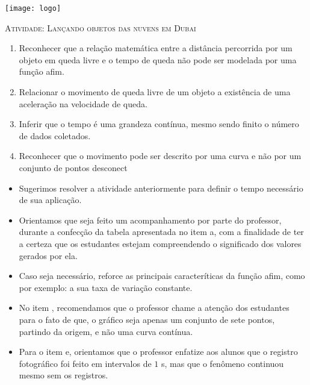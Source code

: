 \documentclass[10 pt,usenames,dvipsnames, oneside]{article}
\begin{document}
\begin{center}
  \begin{minipage}[l]{3cm}
\texttt{[image: logo]}    
\end{minipage}\hfill
\begin{minipage}[r]{.8\textwidth}
 {\Large \scshape Atividade: Lançando objetos das nuvens em Dubai}  
\end{minipage}
\end{center}
\vspace{.2cm}

\ifdefined\prof

\begin{goals}
\begin{enumerate}
\item Reconhecer que a relação matemática entre a distância percorrida por um objeto em queda livre e o tempo de queda não pode ser modelada por uma função afim.
\item Relacionar o movimento de queda livre de um objeto a existência de uma aceleração na velocidade de queda.
\item Inferir que o tempo é uma grandeza contínua, mesmo sendo finito o número de dados coletados.
\item Reconhecer que o movimento pode ser descrito por uma curva e não por um conjunto de pontos desconect
\end{enumerate}

\tcblower

\begin{itemize}
\item Sugerimos resolver a atividade anteriormente para definir o tempo necessário de sua aplicação.
\item Orientamos que seja feito um acompanhamento por parte do professor, durante a confecção da tabela apresentada no item a, com a finalidade de ter a certeza que os estudantes estejam compreendendo o significado dos valores gerados por ela.
\item Caso seja necessário, reforce as principais caracteríticas da função afim, como por exemplo: a sua taxa de variação constante.
\item No item , recomendamos que o professor chame a atenção dos estudantes para o fato de que, o gráfico seja apenas um conjunto de sete pontos, partindo da origem, e não uma curva contínua.
\item Para o item e, orientamos que o professor enfatize aos alunos que o registro fotográfico foi feito em intervalos de $1$ s, mas que o fenômeno continuou mesmo sem os registros.
\end{itemize}
\end{goals}
\end{document}
